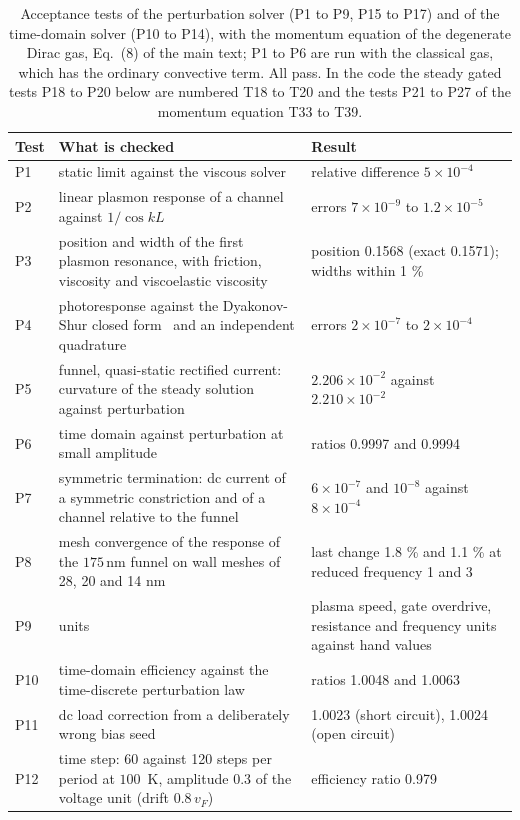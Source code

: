 \documentclass[aps,prapplied,onecolumn,superscriptaddress,floatfix]{revtex4-2}
\newcommand{\nm}{\,\mathrm{nm}}
\begin{document}
\begin{table}[ht]
\caption{Acceptance tests of the perturbation solver (P1 to P9, P15 to P17)
and of the time-domain solver (P10 to P14), with the momentum equation of
the degenerate Dirac gas, Eq.~(8) of the main text; P1 to P6 are run with
the classical gas, which has the ordinary convective term. All
pass. In the code the steady gated tests P18 to P20 below are numbered T18
to T20 and the tests P21 to P27 of the momentum equation T33 to T39.}
\begin{ruledtabular}
\begin{tabular}{lp{}p{}}
Test & What is checked & Result \\
\hline
P1 & static limit against the viscous solver & relative difference $5\times10^{-4}$ \\
P2 & linear plasmon response of a channel against $1/\cos kL$ & errors $7\times10^{-9}$ to $1.2\times10^{-5}$ \\
P3 & position and width of the first plasmon resonance, with friction, viscosity and viscoelastic viscosity & position 0.1568 (exact 0.1571); widths within 1 \% \\
P4 & photoresponse against the Dyakonov-Shur closed form~\cite{dyakonov1996detection} and an independent quadrature & errors $2\times10^{-7}$ to $2\times10^{-4}$ \\
P5 & funnel, quasi-static rectified current: curvature of the steady solution against perturbation & $2.206\times10^{-2}$ against $2.210\times10^{-2}$ \\
P6 & time domain against perturbation at small amplitude & ratios 0.9997 and 0.9994 \\
P7 & symmetric termination: dc current of a symmetric constriction and of a channel relative to the funnel & $6\times10^{-7}$ and $10^{-8}$ against $8\times10^{-4}$ \\
P8 & mesh convergence of the response of the $175\nm$ funnel on wall meshes of 28, 20 and 14 nm & last change 1.8 \% and 1.1 \% at reduced frequency 1 and 3 \\
P9 & units & plasma speed, gate overdrive, resistance and frequency units against hand values \\
P10 & time-domain efficiency against the time-discrete perturbation law & ratios 1.0048 and 1.0063 \\
P11 & dc load correction from a deliberately wrong bias seed & 1.0023 (short circuit), 1.0024 (open circuit) \\
P12 & time step: 60 against 120 steps per period at $100$~K, amplitude $0.3$ of the voltage unit (drift $0.8\,v_{F}$) & efficiency ratio 0.979 \\

\end{tabular}
\end{ruledtabular}
\end{table}
\end{document}
